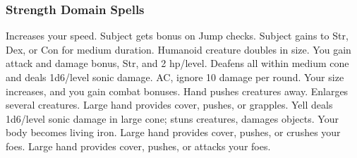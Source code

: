 \subsubsection{Strength Domain Spells}
\begin{spelllist}
 Increases your speed.
 Subject gets bonus on Jump checks.
 Subject gains  to Str, Dex, or Con for medium duration.
\spellhead[2]{}
 Humanoid creature doubles in size.
 You gain attack and damage bonus,  Str, and 2 hp/level.
 Deafens all within medium cone and deals 1d6/level sonic damage.
  AC, ignore 10 damage per round.
 Your size increases, and you gain combat bonuses.
 Hand pushes creatures away.
 Enlarges several creatures.
 Large hand provides cover, pushes, or grapples.
 Yell deals 1d6/level sonic damage in large cone; stuns creatures, damages objects.
 Your body becomes living iron.
 Large hand provides cover, pushes, or crushes your foes.
 Large hand provides cover, pushes, or attacks your foes.
\spellhead[9]{} 
\end{spelllist}

